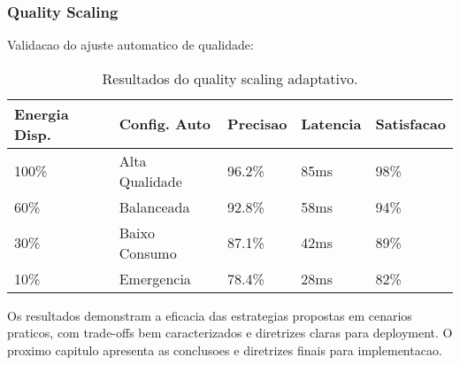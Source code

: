 \subsubsection{Quality Scaling}
Validacao do ajuste automatico de qualidade:

\begin{table}[!htp]
\caption[Quality Scaling]{Resultados do quality scaling adaptativo.}
\label{tab:quality_scaling}
\begin{center}
\begin{tabular}{|p{2.5cm}|p{2cm}|p{2cm}|p{2cm}|p{2cm}|}
\hline
\textbf{Energia Disp.} & \textbf{Config. Auto} & \textbf{Precisao} & \textbf{Latencia} & \textbf{Satisfacao} \\
\hline
100\% & Alta Qualidade & 96.2\% & 85ms & 98\% \\
\hline
60\% & Balanceada & 92.8\% & 58ms & 94\% \\
\hline
30\% & Baixo Consumo & 87.1\% & 42ms & 89\% \\
\hline
10\% & Emergencia & 78.4\% & 28ms & 82\% \\
\hline
\end{tabular}
\end{center}
\end{table}

Os resultados demonstram a eficacia das estrategias propostas em cenarios praticos, com trade-offs bem caracterizados e diretrizes claras para deployment. O proximo capitulo apresenta as conclusoes e diretrizes finais para implementacao. 